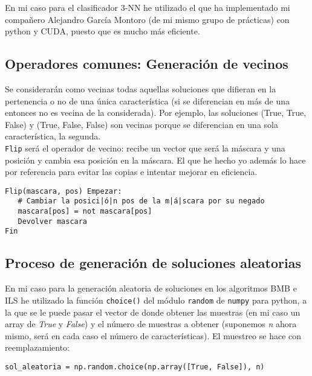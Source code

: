 \documentclass[12pt]{article}
\begin{document}
En mi caso para el clasificador 3-NN he utilizado el que ha implementado mi compañero Alejandro García Montoro (de mi mismo grupo de prácticas) con python y CUDA, puesto que es mucho más eficiente.

\subsection{Operadores comunes: Generación de vecinos}
Se considerarán como vecinas todas aquellas soluciones que difieran en la pertenencia o no de una única característica (si se diferencian en más de una entonces no es vecina de la considerada). Por ejemplo, las soluciones (True, True, False) y (True, False, False) son vecinas porque se diferencian en una sola característica, la segunda.\\
\texttt{Flip} será el operador de vecino: recibe un vector que será la máscara y una posición y cambia esa posición en la máscara. El que he hecho yo además lo hace por referencia para evitar las copias e intentar mejorar en eficiencia.\\

\begin{lstlisting}
Flip(mascara, pos) Empezar:
   # Cambiar la posici|ó|n pos de la m|á|scara por su negado 
   mascara[pos] = not mascara[pos]
   Devolver mascara
Fin
\end{lstlisting}

\subsection{Proceso de generación de soluciones aleatorias}
En mi caso para la generación aleatoria de soluciones en los algoritmos BMB e ILS he utilizado la función \texttt{choice()} del módulo \texttt{random} de \texttt{numpy} para python, a la que se le puede pasar el vector de donde obtener las muestras (en mi caso un array de \textit{True} y \textit{False}) y el número de muestras a obtener (suponemos \textit{n} ahora mismo, será en cada caso el número de características). El muestreo se hace con reemplazamiento:
\begin{lstlisting}
sol_aleatoria = np.random.choice(np.array([True, False]), n)
\end{lstlisting}
\end{document}
